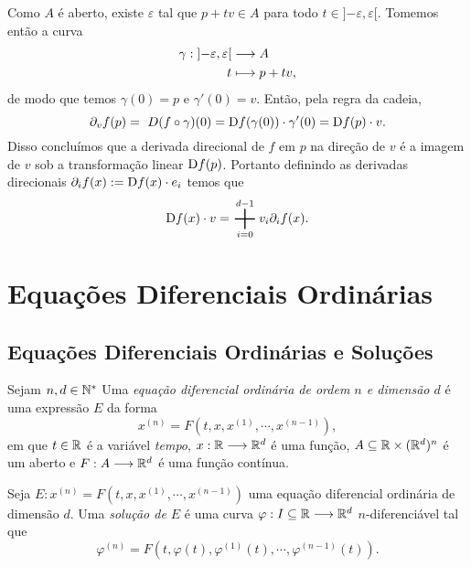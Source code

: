 Como $A$ é aberto, existe $\varepsilon$ tal que $p+tv \in A$ para todo $t \in ]{-\varepsilon},\varepsilon[$. Tomemos então a curva
	\begin{align*}
	{\gamma}: {]{-\varepsilon},\varepsilon[} &\longrightarrow {A} \\{t} &\longmapsto {p+tv},
	\end{align*}
de modo que temos $\gamma(0)=p$ e $\gamma'(0) = v$. Então, pela regra da cadeia,
	\begin{equation*}
	 \partial_v f(p) = \ D (f \circ \gamma)(0) = \mathrm{D} f(\gamma(0)) \cdot \gamma'(0) = \mathrm{D} f(p) \cdot v.
	\end{equation*}
Disso concluímos que a derivada direcional de $f$ em $p$ na direção de $v$ é a imagem de $v$ sob a transformação linear $\mathrm{D} f(p)$. Portanto definindo as derivadas direcionais $\partial_i f(x) := \mathrm{D} f(x) \cdot e_i$ temos que
	\begin{equation*}
	\D f(x) \cdot v = \bigplus_{i=0}^{d-1} v_i \partial_i f(x).
	\end{equation*}















\chapter{Equações Diferenciais Ordinárias}

\section{Equações Diferenciais Ordinárias e Soluções}

\begin{defi}
	Sejam $n,d \in \mathbb{N}^*$ Uma \emph{equação diferencial ordinária de ordem $n$ e dimensão $d$} é uma expressão $E$ da forma
	\begin{equation*}
	x^{(n)} = F(t, x, x^{(1)}, \cdots,x^{(n-1)}),
	\end{equation*}
em que $t \in \mathbb{R}$ é a variável \emph{tempo}, $x : \mathbb{R} \longrightarrow \mathbb{R}^d$ é uma função, $A \subseteq \mathbb{R} \times (\mathbb{R}^d)^n$ é um aberto e $F: A \longrightarrow \mathbb{R}^d$ é uma função contínua.
\end{defi}

\begin{defi}
	Seja $E: x^{(n)} = F(t, x, x^{(1)}, \cdots,x^{(n-1)})$ uma equação diferencial ordinária de dimensão $d$. Uma \emph{solução de $E$} é uma curva $\varphi: I \subseteq \mathbb{R} \longrightarrow \mathbb{R}^d$ $n$-diferenciável tal que
	\begin{equation*}
	\varphi^{(n)} = F(t, \varphi(t), \varphi^{(1)}(t), \cdots,\varphi^{(n-1)}(t)).
	\end{equation*}
\end{defi}

